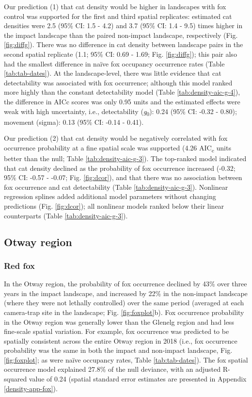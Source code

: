 \documentclass[preprint, 3p, authoryear]{elsarticle} %
\begin{document}
Our prediction (1) that cat density would be higher in landscapes with fox control was supported for the first and third spatial replicates: estimated cat densities were 2.5 (95\% CI: 1.5 - 4.2) and 3.7 (95\% CI: 1.4 - 9.5) times higher in the impact landscape than the paired non-impact landscape, respectively (Fig. \ref{fig:diffg}). There was no difference in cat density between landscape pairs in the second spatial replicate (1.1; 95\% CI: 0.69 - 1.69; Fig. \ref{fig:diffg}); this pair also had the smallest difference in naïve fox occupancy occurrence rates (Table \ref{tab:tab-dates}). At the landscape-level, there was little evidence that cat detectability was associated with fox occurrence; although this model ranked more highly than the constant detectability model (Table \ref{tab:density-aic-g-4}), the difference in AICc scores was only 0.95 units and the estimated effects were weak with high uncertainty, i.e., detectability (\emph{g}\textsubscript{0}): 0.24 (95\% CI: -0.32 - 0.80); movement (sigma): 0.13 (95\% CI: -0.14 - 0.41).

Our prediction (2) that cat density would be negatively correlated with fox occurrence probability at a fine spatial scale was supported (4.26 AIC\textsubscript{c} units better than the null; Table \ref{tab:density-aic-g-3}). The top-ranked model indicated that cat density declined as the probability of fox occurrence increased (-0.32; 95\% CI: -0.57 - -0.07; Fig. \ref{fig:dcor}), and that there was no association between fox occurrence and cat detectability (Table \ref{tab:density-aic-g-3}). Nonlinear regression splines added additional model parameters without changing predictions (Fig. \ref{fig:dcor}); all nonlinear models ranked below their linear counterparts (Table \ref{tab:density-aic-g-3}).

\hypertarget{otway-region}{%
\subsection{Otway region}\label{otway-region}}

\hypertarget{red-fox-1}{%
\subsubsection{Red fox}\label{red-fox-1}}

In the Otway region, the probability of fox occurrence declined by 43\% over three years in the impact landscape, and increased by 22\% in the non-impact landscape (where they were not lethally controlled) over the same period (averaged at each camera-trap site in the landscape; Fig. \ref{fig:foxplot}b). Fox occurrence probability in the Otway region was generally lower than the Glenelg region and had less fine-scale spatial variation. For example, fox occurrence was predicted to be spatially consistent across the entire Otway region in 2018 (i.e., fox occurrence probability was the same in both the impact and non-impact landscape, Fig. \ref{fig:foxplot}; as were naïve occupancy rates, Table \ref{tab:tab-dates}). The fox spatial occurrence model explained 27.8\% of the null deviance, with an adjusted R-squared value of 0.24 (spatial standard error estimates are presented in Appendix \ref{density-app-fox}).
\end{document}

